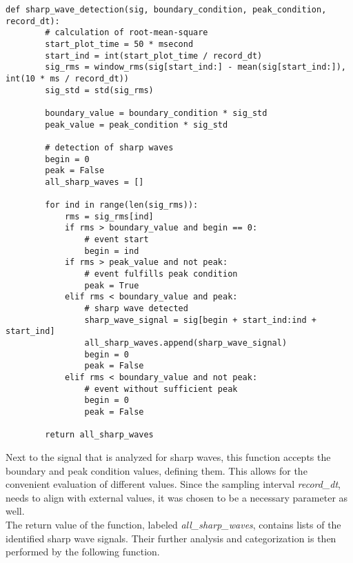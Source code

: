     \begin{lstlisting}[caption={Sharp Wave Detection Function}]
    def sharp_wave_detection(sig, boundary_condition, peak_condition, record_dt):
        # calculation of root-mean-square
        start_plot_time = 50 * msecond
        start_ind = int(start_plot_time / record_dt)
        sig_rms = window_rms(sig[start_ind:] - mean(sig[start_ind:]), int(10 * ms / record_dt))
        sig_std = std(sig_rms)
    
        boundary_value = boundary_condition * sig_std
        peak_value = peak_condition * sig_std
    
        # detection of sharp waves
        begin = 0
        peak = False
        all_sharp_waves = []
    
        for ind in range(len(sig_rms)):
            rms = sig_rms[ind]
            if rms > boundary_value and begin == 0:
                # event start
                begin = ind
            if rms > peak_value and not peak:
                # event fulfills peak condition
                peak = True
            elif rms < boundary_value and peak:
                # sharp wave detected
                sharp_wave_signal = sig[begin + start_ind:ind + start_ind]
                all_sharp_waves.append(sharp_wave_signal)
                begin = 0
                peak = False
            elif rms < boundary_value and not peak:
                # event without sufficient peak
                begin = 0
                peak = False
    
        return all_sharp_waves
    \end{lstlisting}
     Next to the signal that is analyzed for sharp waves, this function accepts the boundary and peak condition values, defining them. This allows for the convenient evaluation of different values. Since the sampling interval \textit{record\_dt}, needs to align with external values, it was chosen to be a necessary parameter as well.\\
     The return value of the function, labeled \textit{all\_sharp\_waves}, contains lists of the identified sharp wave signals. Their further analysis and categorization is then performed by the following function. 

